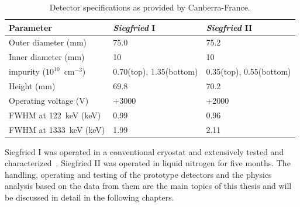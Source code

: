 \begin{table}[tbhp]
  \centering
  \caption{Detector specifications as provided by Canberra-France.}
  \label{tab:tt:detpar}
  \begin{tabular}{lll}\\\hline
    Parameter & \emph{Siegfried} I  & \emph{Siegfried} II \\\hline
    Outer diameter (mm)   & 75.0 & 75.2\\ 
    Inner diameter (mm)   & 10 & 10 \\ 
    impurity ($10^{10}$~cm$^{-3}$) & 0.70(top), 1.35(bottom) & 0.35(top), 0.55(bottom) \\
    Height (mm)           & 69.8 & 70.2 \\\hline 
    Operating voltage (V) & +3000 & +2000 \\ 
    FWHM at 122~keV (keV)  & 0.99 & 0.96 \\ 
    FWHM at 1333~keV (keV) & 1.99 & 2.11 \\ \hline 
  \end{tabular}
\end{table}

Siegfried I was operated in a conventional cryostat and extensively
tested and characterized~\cite{Sie07}. Siegfried II was operated in
liquid nitrogen for five months. The handling, operating and testing
of the prototype detectors and the physics analysis based on the data
from them are the main topics of this thesis and will be discussed in
detail in the following chapters.

